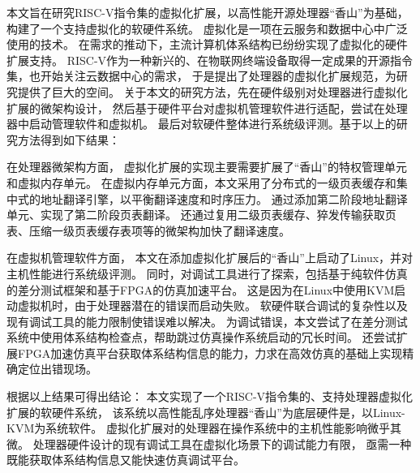 \begin{cabstract}
本文旨在研究RISC-V指令集的虚拟化扩展，以高性能开源处理器“香山”为基础，构建了一个支持虚拟化的软硬件系统。
虚拟化是一项在云服务和数据中心中广泛使用的技术。
在需求的推动下，主流计算机体系结构已纷纷实现了虚拟化的硬件扩展支持。
RISC-V作为一种新兴的、在物联网终端设备取得一定成果的开源指令集，也开始关注云数据中心的需求，
于是提出了处理器的虚拟化扩展规范，为研究提供了巨大的空间。
关于本文的研究方法，先在硬件级别对处理器进行虚拟化扩展的微架构设计，
然后基于硬件平台对虚拟机管理软件进行适配，尝试在处理器中启动管理软件和虚拟机。
最后对软硬件整体进行系统级评测。基于以上的研究方法得到如下结果：

在处理器微架构方面，
虚拟化扩展的实现主要需要扩展了“香山”的特权管理单元和虚拟内存单元。
在虚拟内存单元方面，本文采用了分布式的一级页表缓存和集中式的地址翻译引擎，以平衡翻译速度和时序压力。
通过添加第二阶段地址翻译单元、实现了第二阶段页表翻译。
还通过复用二级页表缓存、猝发传输获取页表、压缩一级页表缓存表项等的微架构加快了翻译速度。

在虚拟机管理软件方面，
本文在添加虚拟化扩展后的“香山”上启动了Linux，并对主机性能进行系统级评测。
同时，对调试工具进行了探索，包括基于纯软件仿真的差分测试框架和基于FPGA的仿真加速平台。
这是因为在Linux中使用KVM启动虚拟机时，由于处理器潜在的错误而启动失败。
软硬件联合调试的复杂性以及现有调试工具的能力限制使错误难以解决。
为调试错误，本文尝试了在差分测试系统中使用体系结构检查点，帮助跳过仿真操作系统启动的冗长时间。
还尝试扩展FPGA加速仿真平台获取体系结构信息的能力，力求在高效仿真的基础上实现精确定位出错现场。

根据以上结果可得出结论：
本文实现了一个RISC-V指令集的、支持处理器虚拟化扩展的软硬件系统，
该系统以高性能乱序处理器“香山”为底层硬件是，以Linux-KVM为系统软件。
虚拟化扩展对的处理器在操作系统中的主机性能影响微乎其微。
处理器硬件设计的现有调试工具在虚拟化场景下的调试能力有限，
亟需一种既能获取体系结构信息又能快速仿真调试平台。

\end{cabstract}

